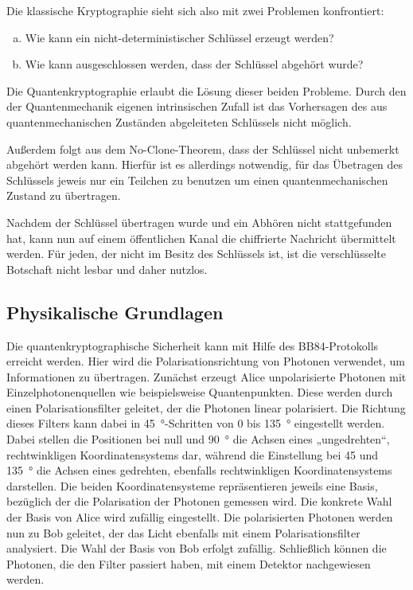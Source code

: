 Die klassische Kryptographie sieht sich also mit zwei Problemen konfrontiert:
\begin{enumerate}[a)]
 \item Wie kann ein nicht-deterministischer Schlüssel erzeugt werden?
 \item Wie kann ausgeschlossen werden, dass der Schlüssel abgehört wurde?
\end{enumerate}

Die Quantenkryptographie erlaubt die Lösung dieser beiden Probleme. Durch
den der Quantenmechanik eigenen intrinsischen Zufall ist das Vorhersagen
des aus quantenmechanischen Zuständen abgeleiteten Schlüssels nicht möglich.

Außerdem folgt aus dem No-Clone-Theorem, dass der Schlüssel nicht unbemerkt
abgehört werden kann. Hierfür ist es allerdings notwendig, für das Übetragen des
Schlüssels jeweis nur ein Teilchen zu benutzen um einen quantenmechanischen
Zustand zu übertragen.

Nachdem der Schlüssel übertragen wurde und ein Abhören nicht stattgefunden hat,
kann nun auf einem öffentlichen Kanal die chiffrierte Nachricht übermittelt werden.
Für jeden, der nicht im Besitz des Schlüssels ist, ist die verschlüsselte
Botschaft nicht lesbar und daher nutzlos.

\subsection{Physikalische Grundlagen}

Die quantenkryptographische Sicherheit kann mit Hilfe des BB84-Protokolls
erreicht werden. Hier wird die Polarisationsrichtung von Photonen verwendet, um
Informationen zu übertragen. Zunächst erzeugt Alice unpolarisierte Photonen mit
Einzelphotonenquellen wie beispielsweise Quantenpunkten. Diese werden durch
einen Polarisationsfilter geleitet, der die Photonen linear polarisiert. Die
Richtung dieses Filters kann dabei in \SI{45}{\degree}-Schritten von 0 bis
\SI{135}{\degree} eingestellt werden. Dabei stellen die Positionen bei null und
\SI{90}{\degree} die Achsen eines „ungedrehten“, rechtwinkligen
Koordinatensystems dar, während die Einstellung bei 45 und \SI{135}{\degree} die
Achsen eines gedrehten, ebenfalls rechtwinkligen Koordinatensystems darstellen.
Die beiden Koordinatensysteme repräsentieren jeweils eine Basis, bezüglich der
die Polarisation der Photonen gemessen wird. Die konkrete Wahl der Basis von
Alice wird zufällig eingestellt. Die polarisierten Photonen werden nun zu Bob
geleitet, der das Licht ebenfalls mit einem Polarisationsfilter analysiert. Die
Wahl der Basis von Bob erfolgt zufällig. Schließlich können die Photonen, die
den Filter passiert haben, mit einem Detektor nachgewiesen werden.

